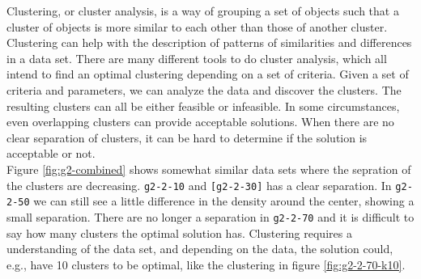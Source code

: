 \documentclass[a4paper,10pt]{article}
\theoremstyle{plain}
\theoremstyle{definition}
\begin{document}
Clustering, or cluster analysis, is a way of grouping a set of objects such that a cluster of objects is more similar to each other than those of another cluster. Clustering can help with the description of patterns of similarities and differences in a data set. There are many different tools to do cluster analysis, which all intend to find an optimal clustering depending on a set of criteria. Given a set of criteria and parameters, we can analyze the data and discover the clusters. The resulting clusters can all be either feasible or infeasible. In some circumstances, even overlapping clusters can provide acceptable solutions. When there are no clear separation of clusters, it can be hard to determine if the solution is acceptable or not.\\
Figure \ref{fig:g2-combined} shows somewhat similar data sets where the sepration of the clusters are decreasing. \texttt{g2-2-10} and \texttt{[g2-2-30]} has a clear separation. In \texttt{g2-2-50} we can still see a little difference in the density around the center, showing a small separation. There are no longer a separation in \texttt{g2-2-70} and it is difficult to say how many clusters the optimal solution has. Clustering requires a understanding of the data set, and depending on the data, the solution could, e.g., have 10 clusters to be optimal, like the clustering in figure \ref{fig:g2-2-70-k10}.
\end{document}
